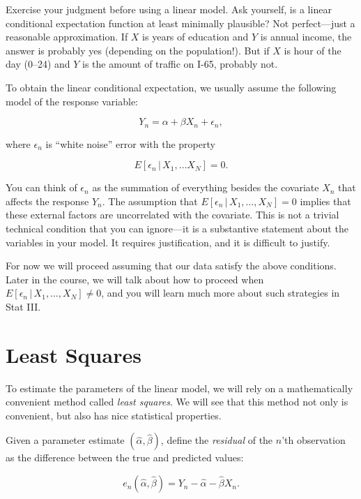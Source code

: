 \documentclass[12pt,oneside,openany]{book}
\begin{document}
Exercise your judgment before using a linear model. Ask yourself, is a
linear conditional expectation function at least minimally plausible?
Not perfect---just a reasonable approximation. If \(X\) is years of
education and \(Y\) is annual income, the answer is probably yes
(depending on the population!). But if \(X\) is hour of the day (0--24)
and \(Y\) is the amount of traffic on I-65, probably not.

To obtain the linear conditional expectation, we usually assume the
following model of the response variable:

\begin{equation}
Y_n = \alpha + \beta X_n + \epsilon_n,
\end{equation}

where \(\epsilon_n\) is ``white noise'' error with the property

\begin{equation}
E[\epsilon_n \,|\, X_1, \ldots X_N] = 0.
\end{equation}

You can think of \(\epsilon_n\) as the summation of everything besides
the covariate \(X_n\) that affects the response \(Y_n\). The assumption
that \(E[\epsilon_n \,|\, X_1, \ldots, X_N] = 0\) implies that these
external factors are uncorrelated with the covariate. This is not a
trivial technical condition that you can ignore---it is a substantive
statement about the variables in your model. It requires justification,
and it is difficult to justify.

For now we will proceed assuming that our data satisfy the above
conditions. Later in the course, we will talk about how to proceed when
\(E[\epsilon_n \,|\, X_1, \ldots, X_N] \neq 0\), and you will learn much
more about such strategies in Stat III.

\section{Least Squares}\label{least-squares}

To estimate the parameters of the linear model, we will rely on a
mathematically convenient method called \emph{least squares}. We will
see that this method not only is convenient, but also has nice
statistical properties.

Given a parameter estimate \((\hat{\alpha}, \hat{\beta})\), define the
\emph{residual} of the \(n\)'th observation as the difference between
the true and predicted values:

\begin{equation}
e_n(\hat{\alpha}, \hat{\beta}) = Y_n - \hat{\alpha} - \hat{\beta} X_n.
\end{equation}
\end{document}
